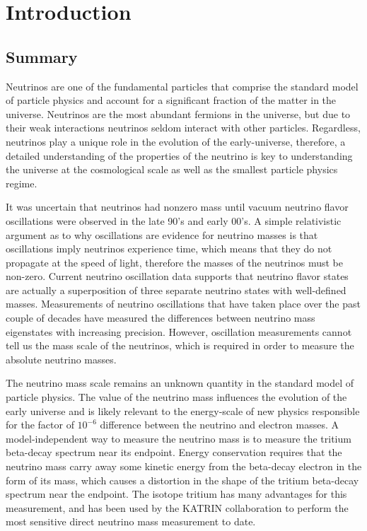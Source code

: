 
\chapter{Introduction} 
\label{chap:introduction}

\section{Summary}

Neutrinos are one of the fundamental particles that comprise the standard model of particle physics and account for a significant fraction of the matter in the universe. Neutrinos are the most abundant fermions in the universe, but due to their weak interactions neutrinos seldom interact with other particles. Regardless, neutrinos play a unique role in the evolution of the early-universe, therefore, a detailed understanding of the properties of the neutrino is key to understanding the universe at the cosmological scale as well as the smallest particle physics regime.

It was uncertain that neutrinos had nonzero mass until vacuum neutrino flavor oscillations were observed in the late 90's and early 00's. A simple relativistic argument as to why oscillations are evidence for neutrino masses is that oscillations imply neutrinos experience time, which means that they do not propagate at the speed of light, therefore the masses of the neutrinos must be non-zero. Current neutrino oscillation data supports that neutrino flavor states are actually a superposition of three separate neutrino states with well-defined masses. Measurements of neutrino oscillations that have taken place over the past couple of decades have measured the differences between neutrino mass eigenstates with increasing precision. However, oscillation measurements cannot tell us the mass scale of the neutrinos, which is required in order to measure the absolute neutrino masses.

The neutrino mass scale remains an unknown quantity in the standard model of particle physics. The value of the neutrino mass influences the evolution of the early universe and is likely relevant to the energy-scale of new physics responsible for the factor of $10^{-6}$ difference between the neutrino and electron masses. A model-independent way to measure the neutrino mass is to measure the tritium beta-decay spectrum near its endpoint. Energy conservation requires that the neutrino mass carry away some kinetic energy from the beta-decay electron in the form of its mass, which causes a distortion in the shape of the tritium beta-decay spectrum near the endpoint. The isotope tritium has many advantages for this measurement, and has been used by the KATRIN collaboration to perform the most sensitive direct neutrino mass measurement to date.

